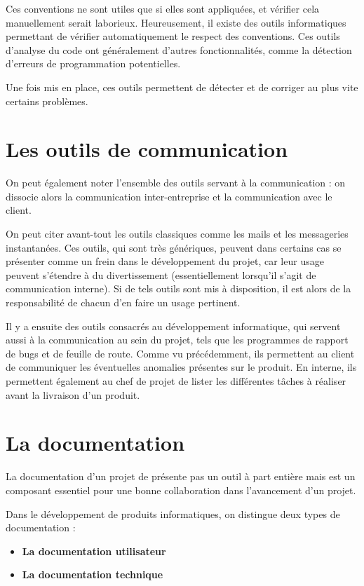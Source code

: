Ces conventions ne sont utiles que si elles sont appliquées, et vérifier cela manuellement serait laborieux. Heureusement, il existe des outils informatiques permettant de vérifier automatiquement le respect des conventions. Ces outils d’analyse du code ont généralement d’autres fonctionnalités, comme la détection d’erreurs de programmation potentielles.

Une fois mis en place, ces outils permettent de détecter et de corriger au plus vite certains problèmes.

\section{Les outils de communication}

On peut également noter l'ensemble des outils servant à la communication : on dissocie alors la communication inter-entreprise et la communication avec le client.

On peut citer avant-tout les outils classiques comme les mails et les messageries instantanées. Ces outils, qui sont très génériques, peuvent dans certains cas se présenter comme un frein dans le développement du projet, car leur usage peuvent s'étendre à du divertissement (essentiellement lorsqu'il s'agit de communication interne). Si de tels outils sont mis à disposition, il est alors de la responsabilité de chacun d'en faire un usage pertinent.

Il y a ensuite des outils consacrés au développement informatique, qui servent aussi à la communication au sein du projet, tels que les programmes de rapport de bugs et de feuille de route. Comme vu précédemment, ils permettent au client de communiquer les éventuelles anomalies présentes sur le produit. En interne, ils permettent également au chef de projet de lister les différentes tâches à réaliser avant la livraison d'un produit.

\section{La documentation}

La documentation d'un projet de présente pas un outil à part entière mais est un composant essentiel pour une bonne collaboration dans l'avancement d'un projet.

Dans le développement de produits informatiques, on distingue deux types de documentation :
\begin{itemize}
\item \textbf{La documentation utilisateur}
\item \textbf{La documentation technique}
\end{itemize}

